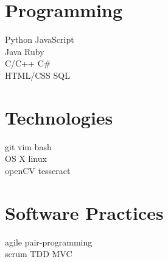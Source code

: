 \documentclass[]{deedy-resume}
\begin{document}
%
%

%
%

%
%

\begin{minipage}[t]{0.33\textwidth}


\section{Programming}
Python \textbullet{} JavaScript\\
Java \textbullet{} Ruby \\
C/C++ \textbullet{} C\# \\
HTML/CSS \textbullet{} SQL \\

\section{Technologies}
git \textbullet{} vim \textbullet{} bash \\
OS X \textbullet{} linux \\
openCV \textbullet{} tesseract \\
\sectionsep

\section{Software Practices}
agile \textbullet{} pair-programming \\
scrum \textbullet{} TDD \textbullet{} MVC \\


\end{minipage}
\end{document}
